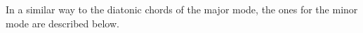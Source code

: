 
In a similar way to the diatonic chords of the major mode,
the ones for the minor mode are described below.
